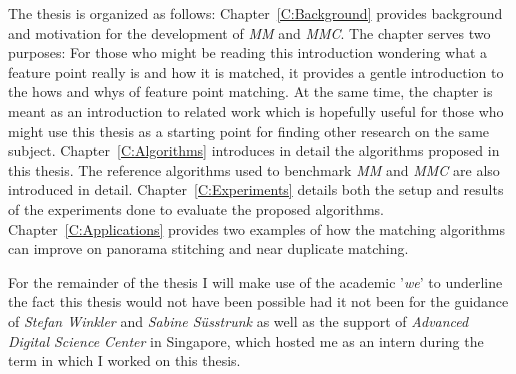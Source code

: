 The thesis is organized as follows: Chapter~\ref{C:Background} provides 
background and motivation for the development of \emph{MM} and 
\emph{MMC}. The chapter serves two purposes:  For those who might be 
reading this introduction wondering what a feature point really is and 
how it is matched, it provides a gentle introduction to the hows and 
whys of feature point matching. At the same time, the chapter is meant 
as an introduction to related work which is hopefully useful for those 
who might use this thesis as a starting point for finding other research 
on the same subject. Chapter~\ref{C:Algorithms} introduces in detail the 
algorithms proposed in this thesis. The reference algorithms used to 
benchmark \emph{MM} and \emph{MMC} are also introduced in detail.  
Chapter~\ref{C:Experiments} details both the setup and results of the 
experiments done to evaluate the proposed algorithms. 
Chapter~\ref{C:Applications} provides two examples of how the matching 
algorithms can improve on panorama stitching and near duplicate 
matching.

For the remainder of the thesis I will make use of the academic 
'\emph{we}' to underline the fact this thesis would not have been 
possible had it not been for the guidance of \emph{Stefan Winkler} and 
\emph{Sabine S\"usstrunk} as well as the support of \emph{Advanced 
Digital Science Center} in Singapore, which hosted me as an intern 
during the term in which I worked on this thesis. 
